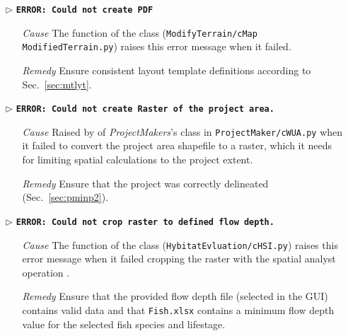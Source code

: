 \begin{itemize}
	\item[$\triangleright$]\textbf{\texttt{ERROR: Could not create PDF}}
	\begin{itemize}
		\item[\textit{Cause}\hspace{0.27cm}] The  function of the  class (\texttt{ModifyTerrain/cMap ModifiedTerrain.py}) raises this error message when it  failed.
		\item[\textit{Remedy}] Ensure consistent layout template definitions according to Sec.~\ref{sec:mtlyt}.\\
	\end{itemize}
	
	\item[$\triangleright$]\textbf{\texttt{ERROR: Could not create Raster of the project area.}}
	\begin{itemize}
		\item[\textit{Cause}\hspace{0.27cm}] Raised by  of \textit{ProjectMakers}'s  class in \texttt{ProjectMaker/cWUA.py} when it failed to convert the project area shapefile to a raster, which it needs for limiting spatial calculations to the project extent.
		\item[\textit{Remedy}] Ensure that the project was correctly delineated (Sec.~\ref{sec:pminp2}).\\
	\end{itemize}
	
	\item[$\triangleright$]\textbf{\texttt{ERROR: Could not crop raster to defined flow depth.}}
	\begin{itemize}
		\item[\textit{Cause}\hspace{0.27cm}] The  function of the  class (\texttt{HybitatEvluation/cHSI.py}) raises this error message when it failed cropping the raster with the spatial analyst operation .
		\item[\textit{Remedy}] Ensure that the provided flow depth file (selected in the GUI) contains valid data and that \texttt{Fish.xlsx} contains a minimum flow depth value for the selected fish species and lifestage.\\
	\end{itemize}
	

\end{itemize}
